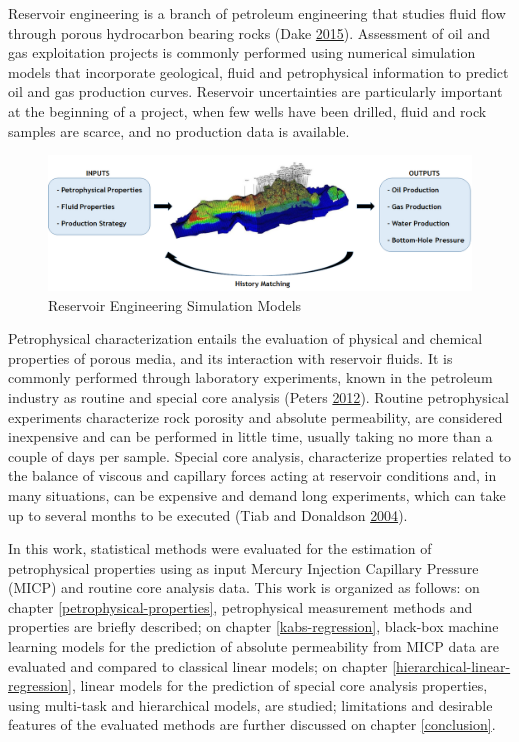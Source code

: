 \documentclass[english,msc,numbers]{coppe}
\begin{document}
  Reservoir engineering is a branch of petroleum engineering that studies fluid flow through porous hydrocarbon bearing rocks (Dake \protect\hyperlink{ref-Dake2015}{2015}). Assessment of oil and gas exploitation projects is commonly performed using numerical simulation models that incorporate geological, fluid and petrophysical information to predict oil and gas production curves. Reservoir uncertainties are particularly important at the beginning of a project, when few wells have been drilled, fluid and rock samples are scarce, and no production data is available.
  \begin{figure}
  
  {\centering \includegraphics[width=1\linewidth]{figure/1-1-ResEng} 
  
  }
  
  \caption{Reservoir Engineering Simulation Models}\label{fig:res-eng}
  \end{figure}
  Petrophysical characterization entails the evaluation of physical and chemical properties of porous media, and its interaction with reservoir fluids. It is commonly performed through laboratory experiments, known in the petroleum industry as routine and special core analysis (Peters \protect\hyperlink{ref-Peters2012}{2012}). Routine petrophysical experiments characterize rock porosity and absolute permeability, are considered inexpensive and can be performed in little time, usually taking no more than a couple of days per sample. Special core analysis, characterize properties related to the balance of viscous and capillary forces acting at reservoir conditions and, in many situations, can be expensive and demand long experiments, which can take up to several months to be executed (Tiab and Donaldson \protect\hyperlink{ref-Tiab2004}{2004}).
  
  In this work, statistical methods were evaluated for the estimation of petrophysical properties using as input Mercury Injection Capillary Pressure (MICP) and routine core analysis data. This work is organized as follows: on chapter \ref{petrophysical-properties}, petrophysical measurement methods and properties are briefly described; on chapter \ref{kabs-regression}, black-box machine learning models for the prediction of absolute permeability from MICP data are evaluated and compared to classical linear models; on chapter \ref{hierarchical-linear-regression}, linear models for the prediction of special core analysis properties, using multi-task and hierarchical models, are studied; limitations and desirable features of the evaluated methods are further discussed on chapter \ref{conclusion}.
  
\end{document}

